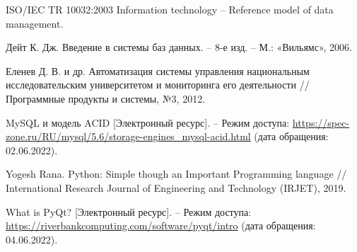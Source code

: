 
\begingroup
\renewcommand{\section}[2]{}
\begin{thebibliography}{}
	
ISO/IEC TR 10032:2003 Information technology – Reference model of data management.

Дейт К. Дж. Введение в системы баз данных. – 8-е изд. – М.: «Вильямс», 2006.

Еленев Д. В. и др. Автоматизация системы управления национальным исследовательским университетом и мониторинга его деятельности // Программные продукты и системы, №3, 2012.

MySQL и модель ACID [Электронный ресурс]. -- Режим доступа: \url {https://spec-zone.ru/RU/mysql/5.6/storage-engines\_mysql-acid.html} (дата обращения: 02.06.2022).

Yogesh Rana. Python: Simple though an Important Programming language // International Research Journal of Engineering and Technology (IRJET), 2019.

What is PyQt? [Электронный ресурс]. -- Режим доступа: \url {https://riverbankcomputing.com/software/pyqt/intro} (дата обращения: 04.06.2022).

\end{thebibliography}
\endgroup